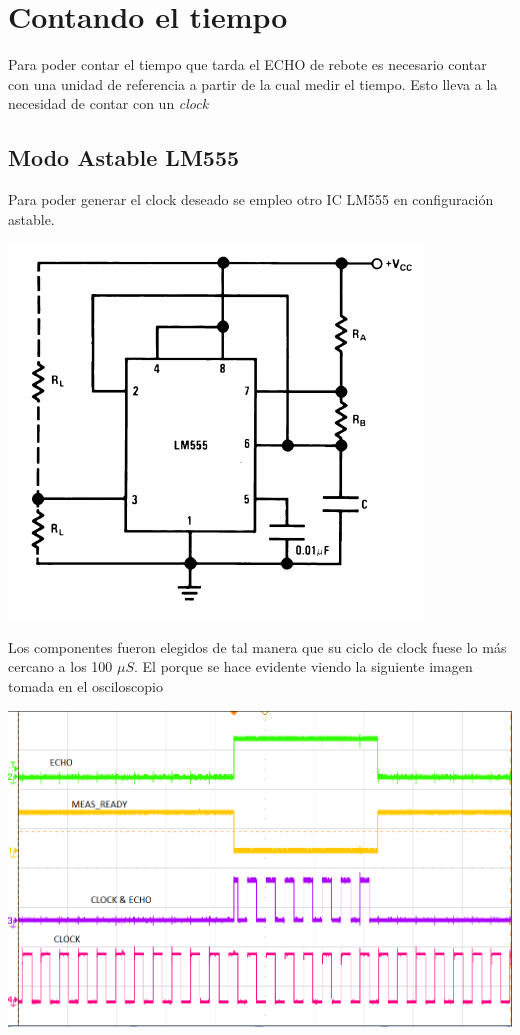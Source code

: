 \section{Contando el tiempo}
Para poder contar el tiempo que tarda el ECHO de rebote es necesario contar con una unidad de referencia a partir de la cual medir el tiempo. Esto lleva a la necesidad de contar con un \emph{clock}
\subsection{Modo Astable LM555}
Para poder generar el clock deseado se empleo otro IC LM555
en configuración astable.
\begin{center}
\includegraphics[scale=0.4]{../8-UltraSound/ASTA555.png}
\end{center}

Los componentes fueron elegidos de tal manera que su ciclo de clock fuese lo más cercano a los 100 $\mu S$. El porque se hace evidente viendo la siguiente imagen tomada en el osciloscopio

\begin{center}
\includegraphics[scale=0.6]{../8-UltraSound/4SLabel.png}
\end{center}

